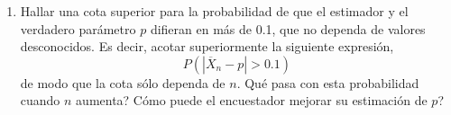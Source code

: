 \documentclass[a4paper, 11pt]{article}
\begin{document}
\begin{enumerate}
\begin{enumerate}
\item Hallar una cota superior para la probabilidad de que el estimador y el
verdadero parámetro $p$ difieran en más de 0.1, que no dependa de
valores desconocidos. Es decir, acotar superiormente la siguiente
expresión,
\[
P\left(  \left\vert \overline{X}_{n}-p\right\vert >0.1\right)
\]
de modo que la cota sólo dependa de $n$. \textquestiondown Qué pasa
con esta probabilidad cuando $n$ aumenta? \textquestiondown Cómo puede el
encuestador mejorar su estimación de $p$?
\end{enumerate}
%
%
%
%
%
%

\end{enumerate}
\end{document}
